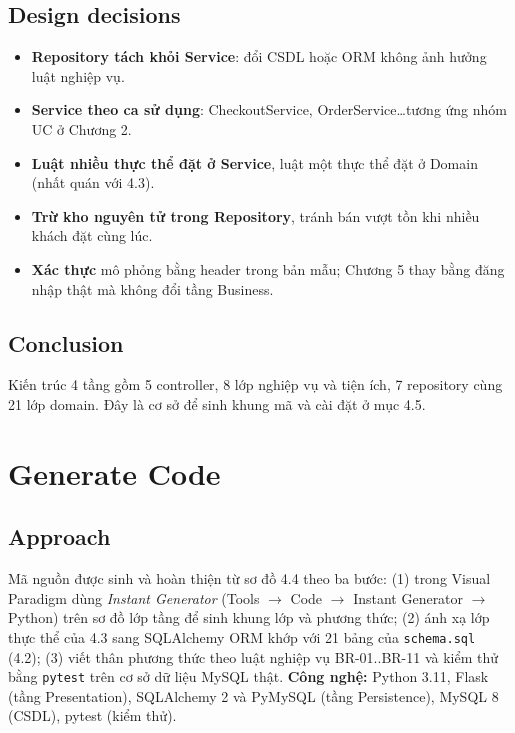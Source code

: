\documentclass[12pt,a4paper,oneside]{report}
\begin{document}
\subsection{Design decisions}
\begin{itemize}\item \textbf{Repository tách khỏi Service}: đổi CSDL hoặc ORM không ảnh hưởng luật nghiệp vụ.\item \textbf{Service theo ca sử dụng}: CheckoutService, OrderService\ldots tương ứng nhóm UC ở Chương 2.\item \textbf{Luật nhiều thực thể đặt ở Service}, luật một thực thể đặt ở Domain (nhất quán với 4.3).\item \textbf{Trừ kho nguyên tử trong Repository}, tránh bán vượt tồn khi nhiều khách đặt cùng lúc.\item \textbf{Xác thực} mô phỏng bằng header trong bản mẫu; Chương 5 thay bằng đăng nhập thật mà không đổi tầng Business.\end{itemize}
\subsection{Conclusion}
Kiến trúc 4 tầng gồm 5 controller, 8 lớp nghiệp vụ và tiện ích, 7 repository cùng 21 lớp domain. Đây là cơ sở để sinh khung mã và cài đặt ở mục 4.5.



\section{Generate Code}
\subsection{Approach}
Mã nguồn được sinh và hoàn thiện từ sơ đồ 4.4 theo ba bước: (1) trong Visual Paradigm dùng \emph{Instant Generator} (Tools $\rightarrow$ Code $\rightarrow$ Instant Generator $\rightarrow$ Python) trên sơ đồ lớp tầng để sinh khung lớp và phương thức; (2) ánh xạ lớp thực thể của 4.3 sang SQLAlchemy ORM khớp với 21 bảng của \texttt{schema.sql} (4.2); (3) viết thân phương thức theo luật nghiệp vụ BR-01..BR-11 và kiểm thử bằng \texttt{pytest} trên cơ sở dữ liệu MySQL thật.
\textbf{Công nghệ:} Python 3.11, Flask (tầng Presentation), SQLAlchemy 2 và PyMySQL (tầng Persistence), MySQL 8 (CSDL), pytest (kiểm thử).
\end{document}
